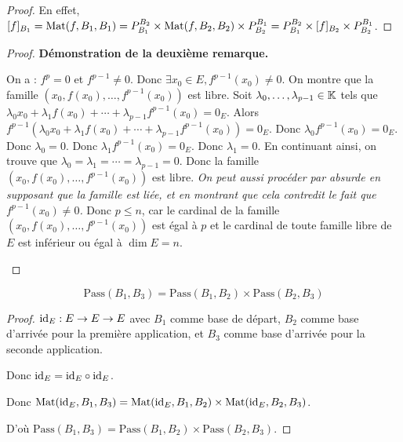 \documentclass[12pt,a4paper]{report}
\begin{document}
\begin{proof}
    En effet, $[f]_{B_1} = \mathrm{Mat}(f, B_1, B_1) = P_{B_1}^{B_2} \times \mathrm{Mat}(f, B_2, B_2) \times P_{B_2}^{B_1} = P_{B_1}^{B_2} \times [f]_{B_2} \times P_{B_2}^{B_1}$.
\end{proof}

\begin{proof}
    \textbf{Démonstration de la deuxième remarque.}

    \begin{outline}
    \1 On a : $f^p = 0$ et $f^{p-1} \ne 0$.
    \1 Donc $\exists x_0 \in E, f^{p-1}(x_0) \ne 0$.
    \1 On montre que la famille $(x_0, f(x_0), \dots, f^{p-1}(x_0))$ est libre.
    \2 Soit $\lambda_0,\dots,\lambda_{p-1} \in \mathbb{K}$ tels que $\lambda_0 x_0 + \lambda_1 f(x_0) + \cdots + \lambda_{p-1} f^{p-1}(x_0) = 0_E$.
    \2 Alors $f^{p-1}(\lambda_0 x_0 + \lambda_1 f(x_0) + \cdots + \lambda_{p-1} f^{p-1}(x_0)) = 0_E$.
    \2 Donc $\lambda_0 f^{p-1}(x_0) = 0_E$.
    \2 Donc $\lambda_0 = 0$.
    \2 Donc $\lambda_1 f^{p-1}(x_0) = 0_E$.
    \2 Donc $\lambda_1 = 0$.
    \2 En continuant ainsi, on trouve que $\lambda_0 = \lambda_1 = \cdots = \lambda_{p-1} = 0$.
    \2 Donc la famille $(x_0, f(x_0), \dots, f^{p-1}(x_0))$ est libre. \textit{On peut aussi procéder par absurde en supposant que la famille est liée, et en montrant que cela contredit le fait que $f^{p-1}(x_0) \ne 0$.}
    \2 Donc $p \le n$, car le cardinal de la famille $(x_0, f(x_0), \dots, f^{p-1}(x_0))$ est égal à $p$ et le cardinal de toute famille libre de $E$ est inférieur ou égal à $\dim E = n$.
    \end{outline}
\end{proof}

\begin{property}
    $$\mathrm{Pass}(B_1,B_3) = \mathrm{Pass}(B_1,B_2) \times \mathrm{Pass}(B_2,B_3)$$
\end{property}

\begin{proof}
    $\mathrm{id}_E : E \to E \to E$ avec $B_1$ comme base de départ, $B_2$ comme base d'arrivée pour la première application, et $B_3$ comme base d'arrivée pour la seconde application.

    Donc $\mathrm{id}_E = \mathrm{id}_E \circ \mathrm{id}_E$.

    Donc $\mathrm{Mat}(\mathrm{id}_E, B_1, B_3) = \mathrm{Mat}(\mathrm{id}_E, B_1, B_2) \times \mathrm{Mat}(\mathrm{id}_E, B_2, B_3)$.

    D'où $\mathrm{Pass}(B_1,B_3) = \mathrm{Pass}(B_1,B_2) \times \mathrm{Pass}(B_2,B_3)$.
\end{proof}
\end{document}
